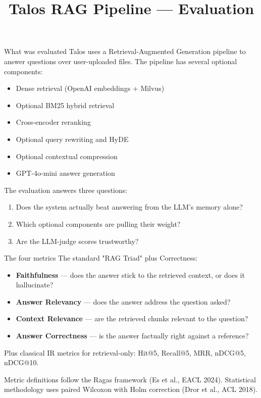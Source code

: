 \documentclass[10pt,aspectratio=169,xcolor={table}]{beamer}
\title[Talos RAG Eval]{Talos RAG Pipeline --- Evaluation}
\subtitle{}
\author{}
\institute{}
\date{}
\begin{document}
\begin{frame}\titlepage\end{frame}

\begin{frame}{What was evaluated}
  Talos uses a Retrieval-Augmented Generation pipeline to answer questions
  over user-uploaded files. The pipeline has several optional components:
  \begin{itemize}
    \item Dense retrieval (OpenAI embeddings + Milvus)
    \item Optional BM25 hybrid retrieval
    \item Cross-encoder reranking
    \item Optional query rewriting and HyDE
    \item Optional contextual compression
    \item GPT-4o-mini answer generation
  \end{itemize}
  \vspace{8pt}
  The evaluation answers three questions:
  \begin{enumerate}
    \item Does the system actually beat answering from the LLM's memory alone?
    \item Which optional components are pulling their weight?
    \item Are the LLM-judge scores trustworthy?
  \end{enumerate}
\end{frame}

\begin{frame}{The four metrics}
  The standard "RAG Triad" plus Correctness:
  \begin{itemize}
    \item \textbf{Faithfulness} --- does the answer stick to the retrieved context, or does it hallucinate?
    \item \textbf{Answer Relevancy} --- does the answer address the question asked?
    \item \textbf{Context Relevance} --- are the retrieved chunks relevant to the question?
    \item \textbf{Answer Correctness} --- is the answer factually right against a reference?
  \end{itemize}
  \vspace{6pt}
  Plus classical IR metrics for retrieval-only: Hit@5, Recall@5, MRR, nDCG@5, nDCG@10.

  \vspace{12pt}
  \footnotesize
  Metric definitions follow the Ragas framework (Es et al., EACL 2024).
  Statistical methodology uses paired Wilcoxon with Holm correction
  (Dror et al., ACL 2018).
\end{frame}
\end{document}
